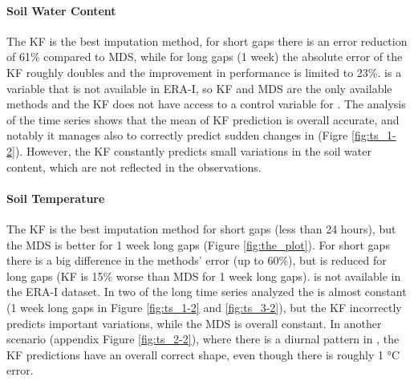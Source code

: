 \documentclass{article}
\begin{document}
\paragraph{Soil Water Content} The KF is the best imputation method, for short gaps there is an error reduction of 61\% compared to MDS, while for long gaps (1 week) the absolute error of the KF roughly doubles and the improvement in performance is limited to 23\%.  is a variable that is not available in ERA-I, so KF and MDS are the only available methods and the KF does not have access to a control variable for .
The analysis of the time series shows that the mean of KF prediction is overall accurate, and notably it manages also to correctly predict sudden changes in  (Figre \ref{fig:ts_1-2}). However, the KF constantly predicts small variations in the soil water content, which are not reflected in the observations.

\paragraph{Soil Temperature} The KF is the best imputation method for short gaps (less than 24 hours), but the MDS is better for 1 week long gaps (Figure \ref{fig:the_plot}). For short gaps there is a big difference in the methods' error (up to 60\%), but is reduced for long gaps (KF is 15\% worse than MDS for 1 week long gaps).
 is not available in the ERA-I dataset.
In two of the long time series analyzed the  is almost constant (1 week long gaps in Figure \ref{fig:ts_1-2} and \ref{fig:ts_3-2}), but the KF incorrectly predicts important variations, while the MDS is overall constant. In another scenario (appendix Figure \ref{fig:ts_2-2}), where there is a diurnal pattern in , the KF predictions have an overall correct shape, even though there is roughly 1 °C error.


\newcommand{\CapTs}[2]{#1 to visualize the imputation of #2 using different methods: Kalman Filter (KF), ERA-Interim (ERA-I) and Marginal Distribution Sampling (MDS). For each variable, three random artificial gap (length 6 hours, 12 hours, 1 week) are imputed using the three methods: Kalman Filter (green), ERA-I (orange), MDS (purple).  For the KF the shaded area shows the uncertainty of the prediction $\pm 2 \sigma$ (standard deviation). The grey shaded area and the vertical black lines delimit the artificial gaps, where the observations are not available to the model but are used to assess the imputation performance. The ERA-I prediction is the control variable of the KF. The KF model has been fine-tuned to each variable (\textit{KF-\textlangle var\textrangle-Sin-6\_336}).}
\end{document}
